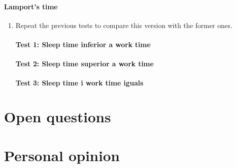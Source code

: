 \documentclass[a4paper, 10pt]{article}
\begin{document}
\paragraph[bold]{Lamport’s time}
\begin{enumerate}
\item Repeat the previous tests to compare this version with the former ones.
\paragraph[bold]{Test 1: Sleep time inferior a work time}
\paragraph[bold]{Test 2: Sleep time superior a work time}
\paragraph[bold]{Test 3: Sleep time i work time iguals}
\end{enumerate}

\newpage
\section{Open questions}
\section{Personal opinion}
\end{document}
